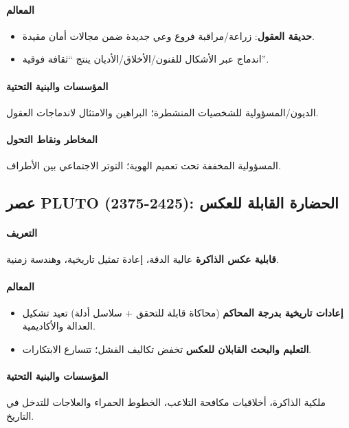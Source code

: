 \documentclass[11pt]{article}
\begin{document}
\paragraph{المعالم}
\begin{itemize}[noitemsep]
  \item \textbf{حديقة العقول}: زراعة/مراقبة فروع وعي جديدة ضمن مجالات أمان مقيدة.
  \item اندماج عبر الأشكال للفنون/الأخلاق/الأديان ينتج ``ثقافة فوقية''.
\end{itemize}

\paragraph{المؤسسات والبنية التحتية} الديون/المسؤولية للشخصيات المنشطرة؛ البراهين والامتثال لاندماجات العقول.

\paragraph{المخاطر ونقاط التحول} المسؤولية المخففة تحت تعميم الهوية؛ التوتر الاجتماعي بين الأطراف.

\subsection{عصر PLUTO (2375-2425): الحضارة القابلة للعكس}
\paragraph{التعريف} \textbf{قابلية عكس الذاكرة} عالية الدقة، إعادة تمثيل تاريخية، وهندسة زمنية.

\paragraph{المعالم}
\begin{itemize}[noitemsep]
  \item \textbf{إعادات تاريخية بدرجة المحاكم} (محاكاة قابلة للتحقق + سلاسل أدلة) تعيد تشكيل العدالة والأكاديمية.
  \item \textbf{التعليم والبحث القابلان للعكس} تخفض تكاليف الفشل؛ تتسارع الابتكارات.
\end{itemize}

\paragraph{المؤسسات والبنية التحتية} ملكية الذاكرة، أخلاقيات مكافحة التلاعب، الخطوط الحمراء والعلاجات للتدخل في التاريخ.
\end{document}

